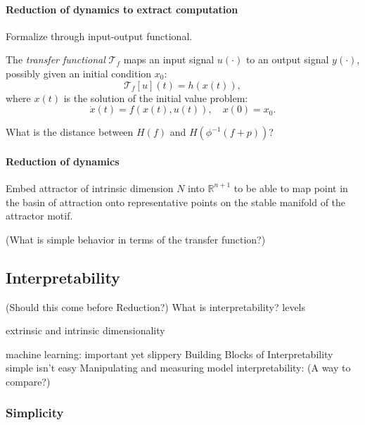 \documentclass{article}
\newcommand{\ascomment}[1]{\textcolor{ascolor}{(#1)}}
\theoremstyle{definition} \newtheorem{definition}{Definition}  \newtheorem{example}{Example}
\theoremstyle{remark} \newtheorem{remark}{Remark}
\newcommand{\reals}{\mathbb{R}}
\newcounter{ct}
\begin{document}
\paragraph{Reduction of dynamics to extract computation}
Formalize through input-output functional.

The \emph{transfer functional} \( \mathcal{T}_f \) maps an input signal \( u(\cdot) \) to an output signal \( y(\cdot) \), possibly given an initial condition \( x_0 \):
\[
\mathcal{T}_f[u](t) = h(x(t)),
\]
where \( x(t) \) is the solution of the initial value problem:
\[
\dot{x}(t) = f(x(t), u(t)), \quad x(0) = x_0.
\]

What is the distance between $H(f)$ and $H(\phi^{-1}(f+p))$?


\paragraph{Reduction of dynamics}
Embed attractor of intrinsic dimension $N$ into $\reals^{n+1}$ to be able to map point in the basin of attraction onto representative points on the stable manifold of the attractor motif.

\ascomment{What is simple behavior in terms of the transfer function?}


\subsection{Interpretability}
\ascomment{Should this come before Reduction?}
What is interpretability? \citep{erasmus2021interpretability}
\citep{madsen2024interpretability}
levels \citep{hochstein2022levels}

\citep{whiteway2019interpretable}
\citep{kar2022interpretability}
extrinsic and intrinsic dimensionality\citep{jazayeri2021interpreting}

 machine learning: important yet slippery\citep{lipton2018mythos}	
 Building Blocks of Interpretability \citep{olah2018interpretability}
\citep{beisbart2022interpretability}
simple isn't easy \citep{raz2024ml}
Manipulating and measuring model interpretability\citep{poursabzi2021manipulating}: \ascomment{A way to compare?}
\citep{he2024multilevel}

\subsubsection{Simplicity}
\citep{gao2015simplicity}
\citep{dyer2023simplest}
\citep{quinn2022information}
\end{document}
